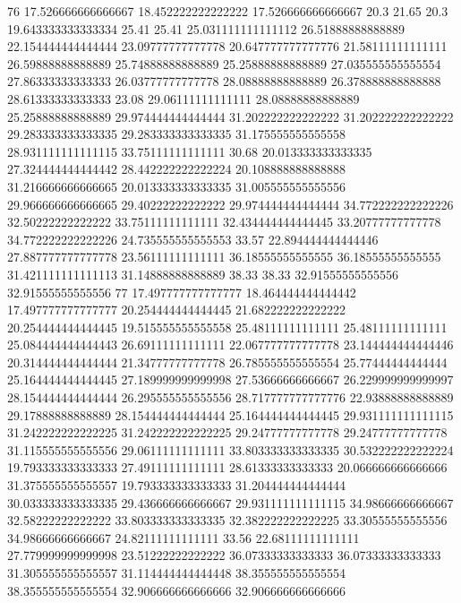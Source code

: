 76 17.526666666666667 18.452222222222222 17.526666666666667 20.3 21.65 20.3 19.643333333333334 25.41 25.41 25.031111111111112 26.51888888888889 22.154444444444444 23.09777777777778 20.647777777777776 21.58111111111111 26.59888888888889 25.74888888888889 25.25888888888889 27.035555555555554 27.86333333333333 26.03777777777778 28.08888888888889 26.378888888888888 28.61333333333333 23.08 29.06111111111111 28.08888888888889 25.25888888888889 29.974444444444444 31.202222222222222 31.202222222222222 29.283333333333335 29.283333333333335 31.175555555555558 28.931111111111115 33.75111111111111 30.68 20.013333333333335 27.324444444444442 28.442222222222224 20.108888888888888 31.216666666666665 20.013333333333335 31.005555555555556 29.966666666666665 29.40222222222222 29.974444444444444 34.772222222222226 32.50222222222222 33.75111111111111 32.434444444444445 33.20777777777778 34.772222222222226 24.735555555555553 33.57 22.894444444444446 27.887777777777778 23.56111111111111 36.18555555555555 36.18555555555555 31.421111111111113 31.14888888888889 38.33 38.33 32.91555555555556 32.91555555555556
77 17.497777777777777 18.464444444444442 17.497777777777777 20.254444444444445 21.682222222222222 20.254444444444445 19.515555555555558 25.48111111111111 25.48111111111111 25.084444444444443 26.69111111111111 22.067777777777778 23.144444444444446 20.314444444444444 21.34777777777778 26.785555555555554 25.77444444444444 25.164444444444445 27.189999999999998 27.53666666666667 26.229999999999997 28.154444444444444 26.295555555555556 28.717777777777776 22.93888888888889 29.17888888888889 28.154444444444444 25.164444444444445 29.931111111111115 31.242222222222225 31.242222222222225 29.24777777777778 29.24777777777778 31.115555555555556 29.06111111111111 33.803333333333335 30.532222222222224 19.793333333333333 27.49111111111111 28.61333333333333 20.066666666666666 31.375555555555557 19.793333333333333 31.204444444444444 30.033333333333335 29.436666666666667 29.931111111111115 34.98666666666667 32.58222222222222 33.803333333333335 32.382222222222225 33.30555555555556 34.98666666666667 24.82111111111111 33.56 22.68111111111111 27.779999999999998 23.51222222222222 36.07333333333333 36.07333333333333 31.305555555555557 31.114444444444448 38.355555555555554 38.355555555555554 32.906666666666666 32.906666666666666
